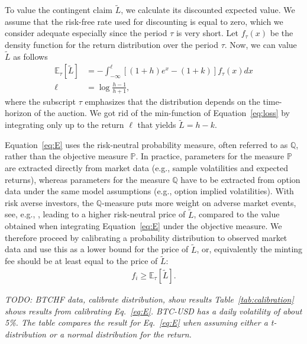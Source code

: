 \documentclass[english,11pt]{article}
\begin{document}
To value the contingent claim $\tilde{L}$, we calculate its discounted expected
value. We assume that the risk-free rate used for discounting is equal to zero,
which we consider adequate especially since the period $\tau$ is very short.
Let $f_{\tau}(x)$ be the density function for the return distribution over the period $\tau$. Now, we can value $\tilde{L}$ as follows
\begin{align}
\mathbb{E}_{\tau}\left[\tilde{L} \right] &= - \int_{-\infty}^{\ell} \left[(1 + h) e^{x} - (1+k) \right] f_{\tau}(x) dx\label{eq:E}\\
\ell &= \log \frac{h-1}{h+1},
\end{align}
where the subscript $\tau$ emphasizes that the distribution depends on the time-horizon of the auction. We got rid of the min-function of Equation~\eqref{eq:loss} by
integrating only up to the return $\ell$ that yields $\tilde{L}=h-k$.

Equation~\eqref{eq:E} uses the risk-neutral probability measure, often referred to as
$\mathbb{Q}$, rather than the objective measure $\mathbb{P}$. In practice,
parameters for the measure $\mathbb{P}$ are extracted directly from market data
(e.g., sample volatilities and expected returns), whereas
parameters for the measure $\mathbb{Q}$ have to be extracted from option data
under the same model assumptions (e.g., option implied volatilities). 
With risk averse investors, the $\mathbb{Q}$-measure puts more
weight on adverse market events, see, e.g., \cite{breeden1978prices}, leading
to a higher risk-neutral price of $\tilde{L}$, compared to the value obtained
when integrating Equation~\eqref{eq:E} under the objective measure.
We therefore proceed by calibrating a probability distribution to observed
market data and use this as a lower bound for the price of $\tilde{L}$, or,
equivalently the minting fee should be at least equal to the price of $\tilde{L}$:
\begin{align}
f_i \geq \mathbb{E}_{\tau}\left[\tilde{L} \right].
\end{align}


\emph{TODO: BTCHF data, calibrate distribution, show results
Table~\ref{tab:calibration} shows results
from calibrating Eq.~\eqref{eq:E}. BTC-USD has a daily volatility of about 5\%. 
The table compares the result for Eq.~\eqref{eq:E} when assuming
either a t-distribution or a normal distribution for the return.}
\end{document}

